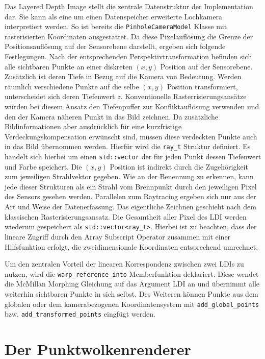 \documentclass[hyperref, beleg, german]{cgvpub}
\begin{document}
Das Layered Depth Image stellt die zentrale Datenstruktur der Implementation
dar. Sie kann als eine um einen Datenspeicher erweiterte Lochkamera
interpretiert werden. So ist bereits die \texttt{PinholeCameraModel} Klasse mit
rasterisierten Koordinaten ausgestattet. Da diese Pixelauflösung die Grenze der
Positionsauflösung auf der Sensorebene darstellt, ergeben sich folgende
Festlegungen. Nach der entsprechenden Perspektivtransformation befinden sich
alle sichtbaren Punkte an einer diskreten \( (x, y) \) Position auf der
Sensorebene. Zusätzlich ist deren Tiefe in Bezug auf die Kamera von Bedeutung.
Werden räumlich verschiedene Punkte auf die selbe \( (x,y) \) Position
transformiert, unterscheidet sich deren Tiefenwert \(z\). Konventionelle
Rasterrisierungsansätze würden bei diesem Ansatz den Tiefenpuffer zur
Konfliktauflösung verwenden und den der Kamera näheren Punkt in das Bild
zeichnen. Da zusätzliche Bildinformationen aber ausdrücklich für eine
kurzfristige Verdeckungskompensation erwünscht sind, müssen diese verdeckten
Punkte auch in das Bild übernommen werden. Hierfür wird die \texttt{ray\_t}
Struktur definiert. Es handelt sich hierbei um einen \texttt{std::vector} der
für jeden Punkt dessen Tiefenwert und Farbe speichert. Die \( (x,y) \) Position
ist indirekt durch die Zugehörigkeit zum jeweiligen Strahlvektor gegeben. Wie
an der Benennung zu erkennen, kann jede dieser Strukturen als ein Strahl vom
Brennpunkt durch den jeweiligen Pixel des Sensors gesehen werden. Parallelen
zum Raytracing ergeben sich nur aus der Art und Weise der Datenerfassung. Das
eigentliche Zeichnen geschieht nach dem klassischen Rasterisierungsansatz. Die
Gesamtheit aller Pixel des LDI werden wiederum gespeichert als
\texttt{std::vector<ray\_t>}. Hierbei ist zu beachten, dass der lineare Zugriff
durch den Array Subscript Operator zusammen mit einer Hilfsfunktion erfolgt,
die zweidimensionale Koordinaten entsprechend umrechnet.

Um den zentralen Vorteil der linearen Korrespondenz zwischen zwei LDIs zu
nutzen, wird die \texttt{warp\_reference\_into} Memberfunktion deklariert.
Diese wendet die McMillan Morphing Gleichung auf das Argument LDI an und
übernimmt alle weiterhin sichtbaren Punkte in sich selbst. Des Weiteren können
Punkte aus dem globalen oder dem kamerabezogenen Koordinatensystem mit
\texttt{add\_global\_points} bzw. \texttt{add\_transformed\_points} eingfügt
werden.

\section{Der Punktwolkenrenderer}
\end{document}
